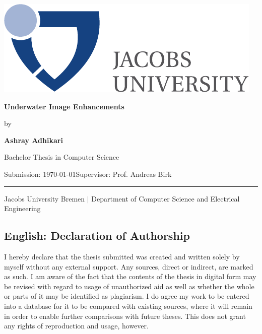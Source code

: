 \documentclass[a4paper,11pt,oneside]{article}
\newcommand{\myname}{Ashray Adhikari}
\newcommand{\mytitle}{Underwater Image Enhancements}
\newcommand{\mysupervisor}{Prof. Andreas Birk}
\begin{document}

  \thispagestyle{empty}

  \begin{flushright}
    \includegraphics[scale=0.8]{bsc-logo}
  \end{flushright}
  \vspace*{40mm}
  \begin{center}
    \huge
    \textbf{\mytitle}
  \end{center}
  \vspace*{4mm}
  \begin{center}
   \Large by
  \end{center}
  \vspace*{4mm}
  \begin{center}
    \LARGE
    \textbf{\myname}
  \end{center}
  \vspace*{20mm}
  \begin{center}
    \Large
    Bachelor Thesis in Computer Science
  \end{center}
  \vfill
  \begin{flushleft}
    \large
    Submission: \today \hfill Supervisor: \mysupervisor \\
    \rule{\textwidth}{1pt}
  \end{flushleft}
  \begin{center}
    Jacobs University Bremen $|$ Department of Computer Science and Electrical Engineering
  \end{center}

  \newpage
  \thispagestyle{empty}

\subsection*{English: Declaration of Authorship}
 
  I hereby declare that the thesis submitted was created and written
  solely by myself without any external support. Any sources, direct
  or indirect, are marked as such. I am aware of the fact that the
  contents of the thesis in digital form may be revised with regard to
  usage of unauthorized aid as well as whether the whole or parts of
  it may be identified as plagiarism. I do agree my work to be entered
  into a database for it to be compared with existing sources, where
  it will remain in order to enable further comparisons with future
  theses. This does not grant any rights of reproduction and usage,
  however.
\end{document}
